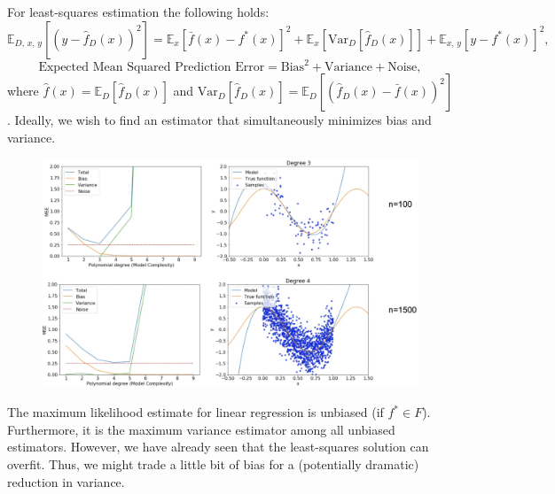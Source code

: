 \documentclass[a4paper]{extarticle}
\begin{document}
For least-squares estimation the following holds:
\[
    \mathbb{E}_{D, \, x, \, y}[(y - \hat{f}_D(x))^2] = \mathbb{E}_x[\bar{f}(x) - f^*(x)]^2 + \mathbb{E}_x[\text{Var}_D[\hat{f}_D(x)]] + \mathbb{E}_{x, \, y}[y - f^*(x)]^2,
\]
\[
    \text{Expected Mean Squared Prediction Error} = \text{Bias}^2 + \text{Variance} + \text{Noise},
\]
where $\hat{f}(x) = \mathbb{E}_D[\hat{f}_D(x)]$ and $\text{Var}_D[\hat{f}_D(x)] = \mathbb{E}_D[(\hat{f}_D(x) - \bar{f}(x))^2]$.
Ideally, we wish to find an estimator that simultaneously minimizes bias and variance.

\begin{figure}[H]
    \includegraphics[width=15cm]{../images/IntroML_Fig10-4}
    \centering
\end{figure}

The maximum likelihood estimate for linear regression is unbiased (if $f^* \in F$). Furthermore, it is the maximum variance estimator among all unbiased estimators. However, we have already seen that the least-squares solution can overfit.
Thus, we might trade a little bit of bias for a (potentially dramatic) reduction in variance.
\end{document}
